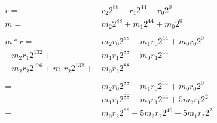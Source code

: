 \documentclass[12pt]{article}
\begin{document}
\begin{align*}
  r= & r_{2}2^{88} + r_{1}2^{44} + r_{0}2^0\\
  m= & m_{2}2^{88} + m_{1}2^{44} + m_{0}2^0\\
\\
m \ast r
 = & m_{2}r_{0}2^{88}  +   m_{1}r_{0}2^{44}  +   m_{0}r_{0}2^0 \\
   + m_{2}r_{1}2^{132} + & m_{1}r_{1}2^{88}  +   m_{0}r_{1}2^{44} \\
   + m_{2}r_{2}2^{176} +   m_{1}r_{2}2^{132} + & m_{0}r_{2}2^{88} \\
\\
= & m_{2}r_{0}2^{88}  +  m_{1}r_{0}2^{44} +  m_{0}r_{0}2^0 \\
+ & m_{1}r_{1}2^{88}  +  m_{0}r_{1}2^{44} + 5m_{2}r_{1}2^{2} \\
+ & m_{0}r_{2}2^{88}  + 5m_{2}r_{2}2^{46} + 5m_{1}r_{2}2^{2} \\
\end{align*}
\end{document}
